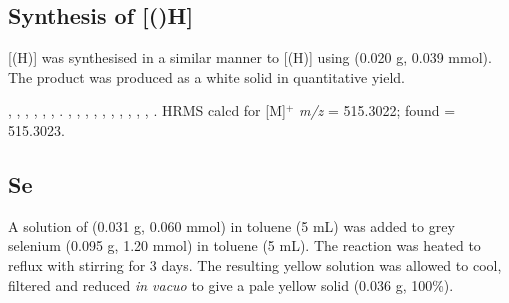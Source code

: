 \subsection*{Synthesis of \texorpdfstring{[(\tBusixantphos)H]} t}


[\tBuSixantphos(H)] was synthesised in a similar manner to [\tBuxantphos(H)] using \tBusixantphos{} (0.020 g, 0.039 mmol).  The product was produced as a white solid in quantitative yield.  

,
,
,
,
,
,
.
,
,
,
,
,
,
,
,
,
,
.
HRMS calcd for  [M]$^+$ \emph{m/z} = 515.3022; found = 515.3023.


\subsection*{\tBuSixantphos Se}


A solution of \tBuXantphos{} (0.031 g, 0.060 mmol) in toluene (5 mL) was added to grey selenium (0.095 g, 1.20 mmol) in toluene (5 mL).  The reaction was heated to reflux with stirring for 3 days.  The resulting yellow solution was allowed to cool, filtered and reduced \emph{in vacuo} to give a pale yellow solid (0.036 g, 100\%).

